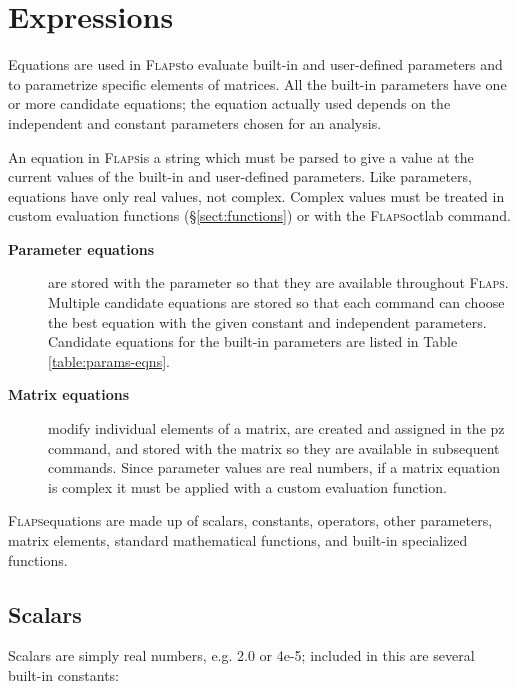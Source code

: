 \documentclass[10pt,openany,twoside]{book}
\numberwithin{equation}{section}   %
\newcommand{\Cmd}[1]{{\sf #1}}
\newcommand{\Flaps}{{\normalfont\scshape Flaps\:}}
\newcommand{\Sectref}[1]{\S\ref{#1}}
\newcommand{\Tableref}[1]{Table \ref{#1}}
\begin{document}
\section{Expressions}\label{sect:expressions}
Equations are used in \Flaps to evaluate built-in and user-defined parameters
and to parametrize specific elements of matrices.
All the built-in parameters have one or more candidate equations; the equation actually
used depends on the independent and constant parameters chosen for an analysis.

An equation in \Flaps is a string which must be parsed to
give a value at the current values of the built-in and user-defined
parameters. Like parameters, equations have only real values, not
complex. Complex values must be treated in custom evaluation functions
(\Sectref{sect:functions}) or with the \Flaps \Cmd{octlab} command.

\begin{description}
\item[{\bf Parameter equations}]\label{sect:parameter-eqns} are stored with
the parameter so that they are available throughout \Flaps. Multiple candidate
equations are stored so that each command can choose the best
equation with the given constant and independent parameters.
Candidate equations for the built-in parameters are
listed in \Tableref{table:params-eqns}.
\item[{\bf Matrix equations}]\label{sect:matrix-eqns} modify individual elements
of a matrix, are created and assigned in the \Cmd{pz} command, and stored
with the matrix so they are available in subsequent commands. Since parameter
values are real numbers, if a matrix equation is complex it must be applied
with a custom evaluation function.
\end{description}

\Flaps equations are made up of scalars,
constants,
operators,
other parameters,
matrix elements,
standard mathematical functions, and
built-in specialized functions.

\subsection{Scalars}\label{sect:scalars}
Scalars are simply real numbers, e.g. 2.0 or 4e-5; included in this
are several built-in constants: 

\end{document}
